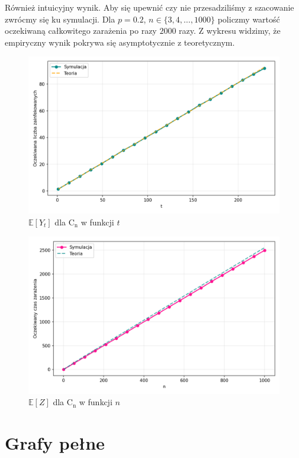 Również intuicyjny wynik. Aby się upewnić czy nie przesadziliśmy z szacowanie zwrócmy się ku symulacji. Dla $p=0.2$, $n\in\{3,4,\dots, 1000\}$ policzmy wartość oczekiwaną całkowitego zarażenia po razy $2000$ razy. Z wykresu widzimy, że empiryczny wynik pokrywa się asymptotycznie z teoretycznym.
\begin{figure}[!ht]
    \centering
    \includegraphics[width=1\textwidth]{../img/cycle/final_infection_expectations.png}
    \caption{$\mathbb{E}[Y_t]$ dla $\mathrm{C_n}$ w funkcji $t$}
\end{figure}
\begin{figure}[!ht]
    \centering
    \includegraphics[width=1\textwidth]{../img/cycle/full_infection_expectation.png}
    \caption{$\mathbb{E}[Z]$ dla $\mathrm{C_n}$ w funkcji $n$}
\end{figure}


\section{Grafy pełne}

